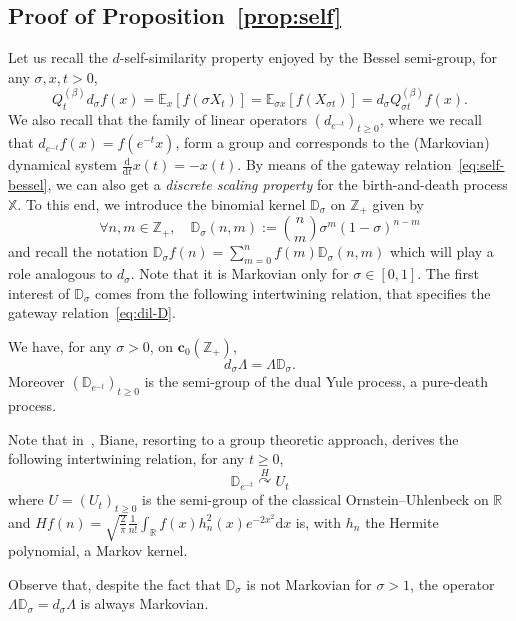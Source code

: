 \documentclass[AHL,Unicode,longabstracts]{cedram}
\newcommand{\df}{\mathrel{:=}}
\newcommand{\cD}{{\discret{D}}}
\newcommand{\RR}{\mathbb{R}}
\newcommand{\ZZ}{\mathbb{Z}}
\newcommand{\esc}{\mathbf{c}}
\newcommand*\E{{\mathbb E}}
\newcommand*\R{{\mathbb R}}
\newcommand{\discret}[1]{\mathds{#1}}
\newcommand{\cont}[1]{{#1}}
\newcommand{\Gate}[3]{#1\stackrel{#2}{\curvearrowright}#3}
\let\oldforall\forall
\renewcommand*{\forall}{\mathrel{\oldforall}}
\newcommand*{\dd}{\mathrm{d}}
\newcommand*{\dx}{\dd x}
\newcommand*{\dt}{\dd t}
\begin{document}
\subsection{Proof of Proposition~\ref{prop:self}} Let us recall the $d$-self-similarity property enjoyed by the Bessel semi-group, for any $\sigma,x,t>0$,
\begin{equation}\label{eq:self-bessel_rec}
\cont{Q}^{(\beta)}_{t}\cont{d}_{\sigma} f(x)=\E_x[f(\sigma X_t)]=\E_{\sigma x}[f(X_{\sigma t})]=\cont{d}_{\sigma}\cont{Q}^{(\beta)}_{\sigma t}f(x).
\end{equation}
We also recall that the family of linear operators $(\cont{d}_{e^{-t}})_{t\geq 0}$, where we recall that $\cont{d}_{e^{-t}}f(x)=f(e^{-t}x)$, form a group and corresponds to the (Markovian) dynamical system $\frac{\dd}{\dt}{x(t)}=-x(t)$. By means of the gateway relation~\eqref{eq:self-bessel}, we can also get a \emph{discrete scaling property} for the birth-and-death process $\discret{X}$. To this end, we introduce the binomial kernel $\discret{D}_\sigma $ on $\ZZ_+$ given by
\[
\forall n,m\in\ZZ_+,\quad \discret{D}_\sigma (n,m)\df\binom{n}{m}\sigma^m(1-\sigma)^{n-m}
\]
and recall the notation $
\discret{D}_\sigma f(n)=\sum_{m=0}^n f(m)\discret{D}_\sigma (n,m)$ which will play a role analogous to $d_\sigma$. Note that it is Markovian only for $\sigma\in[0,1]$. The first interest of $\discret{D}_\sigma $ comes from the following intertwining relation, that specifies the gateway relation~\eqref{eq:dil-D}.
\begin{lemm}\label{lem:dLamD}
We have, for any $\sigma>0$, on $\esc_0(\ZZ_+)$,
\[
\cont{d}_{\sigma}\Lambda=\Lambda \cD_{\sigma}.
\]
Moreover $ (\cD_{e^{-t}})_{t \geq 0}$ is the semi-group of the dual Yule process, a pure-death process.
\end{lemm}
\begin{rema}
Note that in~\cite{Biane-int}, Biane, resorting to a group theoretic approach, derives the following intertwining relation, for any $t\geq 0$,
\[
\Gate{\cD_{e^{-t}}}{H}{U_t}
\]
where $U=(U_t)_{t\geq0}$ is the semi-group of the classical Ornstein--Uhlenbeck on $\RR$ and $H f(n) = \sqrt{\frac{2}{\pi}}\frac{1}{n!}\int_{\R}f(x)h^2_n(x)e^{-2x^2}\dx$ is, with $h_n$ the Hermite polynomial, a Markov kernel.
\end{rema}
\begin{rema}
Observe that, despite the fact that $\discret{D}_\sigma $ is not Markovian for $\sigma>1$, the operator $\Lambda \discret{D}_\sigma =d_\sigma\Lambda$ is always Markovian.
\end{rema}
\end{document}
